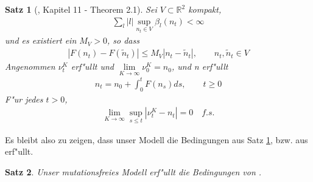 \documentclass[11pt, a4paper, german]{article}
\theoremstyle{plain}
\newtheorem{satz}{Satz}[section]
\begin{document}
	\begin{satz}[\cite{ethier2009markov}, Kapitel 11 - Theorem 2.1]\label{Konvegenzsatz}
		Sei $ V \subset \mathbb{R}^2 $ kompakt,
		\begin{align}
			\sum_l |l| \sup_{n_t \in V} \beta_l(n_t) < \infty \label{RatenEndlich}
		\end{align}
		und es existiert ein $ M_V > 0 $, so dass
		\begin{align}
			|F(n_t) - F(\tilde{n}_t)| \le M_V|n_t - \tilde{n}_t|, \qquad n_t, \tilde{n}_t \in V \label{Lipschitz}
		\end{align}
		Angenommen $ \nu_t^K $ erf"ullt \cite[Kapitel 11 - (2.3)]{ethier2009markov} und $ \lim\limits_{K \to \infty} \nu_0^K = n_0 $, und n erf"ullt
		\begin{align}
			n_t = n_0 + \int_{0}^{t} F(n_s) ds, \qquad t \ge 0 \label{Integralgleichung}
		\end{align}
		F"ur jedes $ t > 0 $,
		\begin{align}
			\lim\limits_{K \to \infty} \sup_{s \le t} | \nu_t^K - n_t | = 0 \quad f.s. \label{Kovergenzbehauptung}
		\end{align}
	\end{satz}
	
	Es bleibt also zu zeigen, dass unser Modell die Bedingungen aus Satz \ref{Konvegenzsatz}, bzw. aus \cite[Kap. 11 - \textbf{Theorem 2.1}]{ethier2009markov} erf"ullt.

	\begin{satz}
		Unser mutationsfreies Modell erf"ullt die Bedingungen von \cite[Kap. 11 - \textbf{Theorem 2.1}]{ethier2009markov}.
	\end{satz}
	
\end{document}
